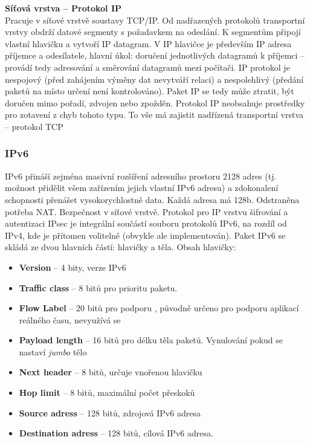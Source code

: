 \textbf{Síťová vrstva -- Protokol IP}\\
Pracuje v síťové vrstvě soustavy TCP/IP. Od nadřazených protokolů transportní vrstvy obdrží datové segmenty s požadavkem na odeslání. K segmentům připojí vlastní hlavičku a vytvoří IP datagram. V IP hlavičce je především IP adresa příjemce a odesílatele, hlavní úkol: doručení jednotlivých datagramů k příjemci
– provádí tedy adresování a směrování datagramů mezi počítači. IP protokol je nespojový (před zahájením výměny dat nevytváří relaci) a nespolehlivý (předání paketů na místo určení není kontrolováno). Paket IP se tedy může ztratit, být doručen mimo pořadí, zdvojen nebo zpožděn. Protokol IP neobsahuje prostředky pro zotavení z chyb tohoto typu. To vše má zajistit nadřízená transportní vrstva – protokol TCP

\subsubsection{IPv6}
IPv6 přináší zejména masivní rozšíření adresního prostoru 2128 adres (tj. možnost přidělit všem zařízením jejich vlastní IPv6 adresu) a zdokonalení schopnosti přenášet vysokorychlostně data. Každá adresa má 128b. Odstraněna potřeba NAT. Bezpečnost v síťové vrstvě. Protokol pro IP vrstvu šifrování a autentizaci IPsec je integrální součástí souboru protokolů IPv6, na rozdíl od IPv4, kde je přítomen volitelně (obvykle ale implementován). Paket IPv6 se skládá ze dvou hlavních částí: hlavičky a těla. Obsah hlavičky:
\begin{itemize}
\item \textbf{Version} -- 4 bity, verze IPv6
\item \textbf{Traffic class} -- 8 bitů pro prioritu paketu.
\item \textbf{Flow Label} -- 20 bitů pro podporu \qos, původně určeno pro podporu aplikací reálného času, nevyužívá se 
\item \textbf{Payload length} -- 16 bitů pro délku těla paketů. Vynulování pokud se nastaví \textit{jumbo} tělo
\item \textbf{Next header} -- 8 bitů, určuje vnořenou hlavičku
\item \textbf{Hop limit} -- 8 bitů, maximální počet přeskoků
\item \textbf{Source adress} -- 128 bitů, zdrojová IPv6 adresa
\item \textbf{Destination adress} -- 128 bitů, cílová IPv6 adresa.
\end{itemize}


